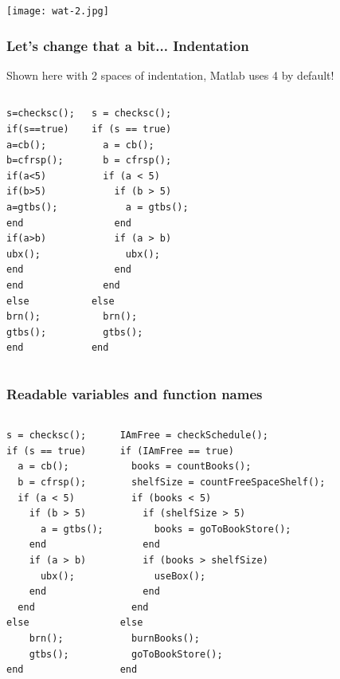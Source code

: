 \begin{frame}[plain]
\texttt{[image: wat-2.jpg]}
\end{frame}

\begin{frame}[fragile]
 \frametitle{Let's change that a bit... Indentation}
 \pause
 Shown here with 2 spaces of indentation, Matlab uses 4 by default!
 \begin{columns}[T]
     \begin{lstlisting}
s=checksc();
if(s==true)
a=cb();
b=cfrsp();
if(a<5)
if(b>5)
a=gtbs();
end
if(a>b)
ubx();
end
end
else
brn();
gtbs();
end
 \end{lstlisting}
     \begin{lstlisting}
s = checksc();
if (s == true)
  a = cb();
  b = cfrsp();
  if (a < 5)
    if (b > 5)
      a = gtbs();
    end
    if (a > b)
      ubx();
    end
  end
else
  brn();
  gtbs();
end
 \end{lstlisting}
 \end{columns}
\end{frame}

\begin{frame}[fragile]
 \frametitle{Readable variables and function names}
 \begin{columns}[T]
\begin{lstlisting}
s = checksc();
if (s == true)
  a = cb();
  b = cfrsp();
  if (a < 5)
    if (b > 5)
      a = gtbs();
    end
    if (a > b)
      ubx();
    end
  end
else
    brn();
    gtbs();
end
 \end{lstlisting}
     \begin{lstlisting}
IAmFree = checkSchedule();
if (IAmFree == true)
  books = countBooks();
  shelfSize = countFreeSpaceShelf();
  if (books < 5)
    if (shelfSize > 5)
      books = goToBookStore();
    end
    if (books > shelfSize)
      useBox();
    end
  end
else
  burnBooks();
  goToBookStore();
end
 \end{lstlisting}
 \end{columns}
\end{frame}

